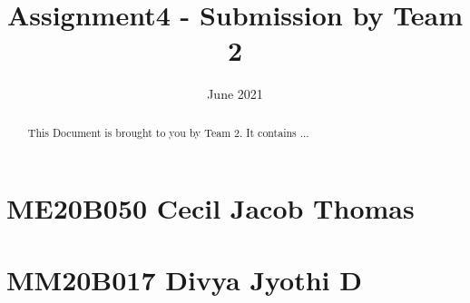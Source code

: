 \documentclass[12pt]{article}
\title{Assignment4 - Submission by Team 2}
\date{June 2021}
\begin{document}
\begin{titlepage}
\maketitle
\end{titlepage}


\begin{abstract}
This Document is brought to you by Team 2.
\newline It contains ...
\end{abstract} 

\newpage

\tableofcontents

\newpage

\section{ME20B050 Cecil Jacob Thomas}
%


\section{MM20B017 Divya Jyothi D}

\newpage



\end{document}
